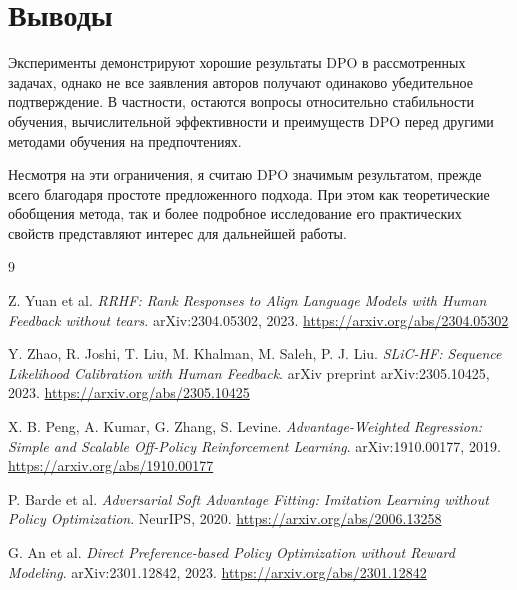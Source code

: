 \documentclass[11pt,a4paper]{article}
\theoremstyle{remark}
\begin{document}
\section{Выводы}

Эксперименты демонстрируют хорошие результаты DPO в рассмотренных задачах, однако не все заявления авторов получают одинаково убедительное подтверждение. В частности, остаются вопросы относительно стабильности обучения, вычислительной эффективности и преимуществ DPO перед другими методами обучения на предпочтениях.

Несмотря на эти ограничения, я считаю DPO значимым результатом, прежде всего благодаря простоте предложенного подхода. При этом как теоретические обобщения метода, так и более подробное исследование его практических свойств представляют интерес для дальнейшей работы.

\begin{thebibliography}{9}

Z. Yuan et al.
\textit{RRHF: Rank Responses to Align Language Models
with Human Feedback without tears}.
arXiv:2304.05302, 2023.
\url{https://arxiv.org/abs/2304.05302}

Y. Zhao, R. Joshi, T. Liu, M. Khalman, M. Saleh, P. J. Liu.
\textit{SLiC-HF: Sequence Likelihood Calibration
with Human Feedback}.
arXiv preprint arXiv:2305.10425, 2023.
\url{https://arxiv.org/abs/2305.10425}

X. B. Peng, A. Kumar, G. Zhang, S. Levine.
\textit{Advantage-Weighted Regression:
Simple and Scalable Off-Policy Reinforcement Learning}.
arXiv:1910.00177, 2019.
\url{https://arxiv.org/abs/1910.00177}

P. Barde et al.
\textit{Adversarial Soft Advantage Fitting:
Imitation Learning without Policy Optimization}.
NeurIPS, 2020.
\url{https://arxiv.org/abs/2006.13258}

G. An et al.
\textit{Direct Preference-based Policy Optimization
without Reward Modeling}.
arXiv:2301.12842, 2023.
\url{https://arxiv.org/abs/2301.12842}

\end{thebibliography}
\end{document}
